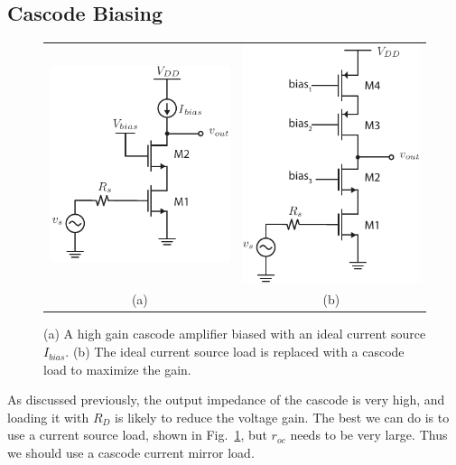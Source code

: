 \subsection{Cascode Biasing}
\begin{figure}[tb]
\centering
\begin{tabular}{cc}
\includegraphics[scale=1]{15cascode_current_source_dc} &
\includegraphics[scale=1]{cascode_current_load_cascode.pdf}\\
(a) & (b)\\
\end{tabular}
\caption{(a) A high gain cascode amplifier biased with an ideal current source $I_{bias}$.  (b) The ideal current source load is replaced with a cascode load to maximize the gain.}  \label{fig:15cascode_current_source_dc}
\end{figure}
As discussed previously, the output impedance of the cascode is very high, and loading it with $R_D$ is likely to reduce the voltage gain.  The best we can do is to use a current source load, shown in Fig.~\ref{fig:15cascode_current_source_dc}, but $r_{oc}$ needs to be very large. Thus we should use a cascode current mirror load.
